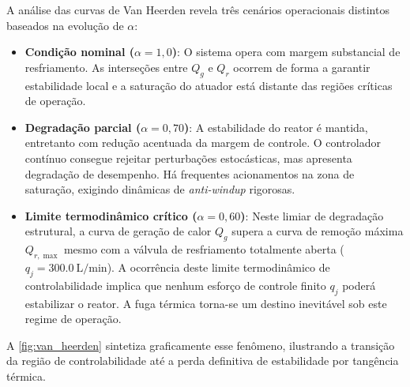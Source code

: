 A análise das curvas de Van Heerden revela três cenários operacionais distintos baseados na evolução de $\alpha$:
\begin{itemize}
    \item \textbf{Condição nominal ($\alpha = 1{,}0$)}: O sistema opera com margem substancial de resfriamento. As interseções entre $Q_g$ e $Q_r$ ocorrem de forma a garantir estabilidade local e a saturação do atuador está distante das regiões críticas de operação.
    \item \textbf{Degradação parcial ($\alpha = 0{,}70$)}: A estabilidade do reator é mantida, entretanto com redução acentuada da margem de controle. O controlador contínuo consegue rejeitar perturbações estocásticas, mas apresenta degradação de desempenho. Há frequentes acionamentos na zona de saturação, exigindo dinâmicas de \textit{anti-windup} rigorosas.
    \item \textbf{Limite termodinâmico crítico ($\alpha = 0{,}60$)}: Neste limiar de degradação estrutural, a curva de geração de calor $Q_g$ supera a curva de remoção máxima $Q_{r,\max}$ mesmo com a válvula de resfriamento totalmente aberta ($q_j = \SI{300.0}{\liter\per\minute}$). A ocorrência deste limite termodinâmico de controlabilidade implica que nenhum esforço de controle finito $q_j$ poderá estabilizar o reator. A fuga térmica torna-se um destino inevitável sob este regime de operação.
\end{itemize}

A \cref{fig:van_heerden} sintetiza graficamente esse fenômeno, ilustrando a transição da região de controlabilidade até a perda definitiva de estabilidade por tangência térmica.

